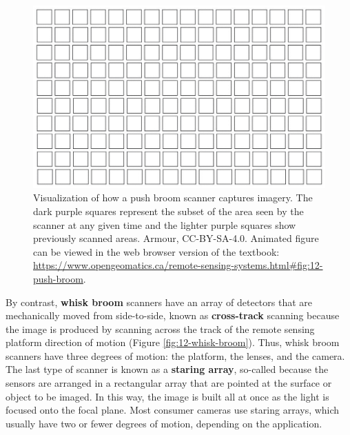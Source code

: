 \documentclass[
]{book}
\begin{document}
\begin{figure}
\includegraphics[width=0.75\linewidth]{images/12-push-broom-static} \caption{Visualization of how a push broom scanner captures imagery. The dark purple squares represent the subset of the area seen by the scanner at any given time and the lighter purple squares show previously scanned areas. Armour, CC-BY-SA-4.0. Animated figure can be viewed in the web browser version of the textbook: \url{https://www.opengeomatics.ca/remote-sensing-systems.html\#fig:12-push-broom}.}\label{fig:12-push-broom}
\end{figure}

By contrast, \textbf{whisk broom} scanners have an array of detectors that are mechanically moved from side-to-side, known as \textbf{cross-track} scanning because the image is produced by scanning across the track of the remote sensing platform direction of motion (Figure \ref{fig:12-whisk-broom}). Thus, whisk broom scanners have three degrees of motion: the platform, the lenses, and the camera. The last type of scanner is known as a \textbf{staring array}, so-called because the sensors are arranged in a rectangular array that are pointed at the surface or object to be imaged. In this way, the image is built all at once as the light is focused onto the focal plane. Most consumer cameras use staring arrays, which usually have two or fewer degrees of motion, depending on the application.
\end{document}
